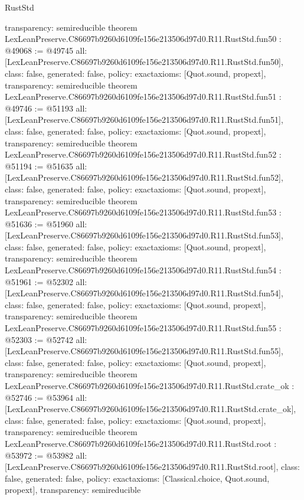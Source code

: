 \begin{lexlean}{RustStd}
\begin{coremodule}
{  transparency: semireducible
}
theorem LexLeanPreserve.C86697b9260d6109fe156e213506d97d0.R11.RustStd.fun50 : @49068 := @49745 {
  all: [LexLeanPreserve.C86697b9260d6109fe156e213506d97d0.R11.RustStd.fun50],
  class: false,
  generated: false,
  policy: exact{axioms: [Quot.sound, propext]},
  transparency: semireducible
}
theorem LexLeanPreserve.C86697b9260d6109fe156e213506d97d0.R11.RustStd.fun51 : @49746 := @51193 {
  all: [LexLeanPreserve.C86697b9260d6109fe156e213506d97d0.R11.RustStd.fun51],
  class: false,
  generated: false,
  policy: exact{axioms: [Quot.sound, propext]},
  transparency: semireducible
}
theorem LexLeanPreserve.C86697b9260d6109fe156e213506d97d0.R11.RustStd.fun52 : @51194 := @51635 {
  all: [LexLeanPreserve.C86697b9260d6109fe156e213506d97d0.R11.RustStd.fun52],
  class: false,
  generated: false,
  policy: exact{axioms: [Quot.sound, propext]},
  transparency: semireducible
}
theorem LexLeanPreserve.C86697b9260d6109fe156e213506d97d0.R11.RustStd.fun53 : @51636 := @51960 {
  all: [LexLeanPreserve.C86697b9260d6109fe156e213506d97d0.R11.RustStd.fun53],
  class: false,
  generated: false,
  policy: exact{axioms: [Quot.sound, propext]},
  transparency: semireducible
}
theorem LexLeanPreserve.C86697b9260d6109fe156e213506d97d0.R11.RustStd.fun54 : @51961 := @52302 {
  all: [LexLeanPreserve.C86697b9260d6109fe156e213506d97d0.R11.RustStd.fun54],
  class: false,
  generated: false,
  policy: exact{axioms: [Quot.sound, propext]},
  transparency: semireducible
}
theorem LexLeanPreserve.C86697b9260d6109fe156e213506d97d0.R11.RustStd.fun55 : @52303 := @52742 {
  all: [LexLeanPreserve.C86697b9260d6109fe156e213506d97d0.R11.RustStd.fun55],
  class: false,
  generated: false,
  policy: exact{axioms: [Quot.sound, propext]},
  transparency: semireducible
}
theorem LexLeanPreserve.C86697b9260d6109fe156e213506d97d0.R11.RustStd.crate_ok : @52746 := @53964 {
  all: [LexLeanPreserve.C86697b9260d6109fe156e213506d97d0.R11.RustStd.crate_ok],
  class: false,
  generated: false,
  policy: exact{axioms: [Quot.sound, propext]},
  transparency: semireducible
}
theorem LexLeanPreserve.C86697b9260d6109fe156e213506d97d0.R11.RustStd.root : @53972 := @53982 {
  all: [LexLeanPreserve.C86697b9260d6109fe156e213506d97d0.R11.RustStd.root],
  class: false,
  generated: false,
  policy: exact{axioms: [Classical.choice, Quot.sound, propext]},
  transparency: semireducible
}


\end{coremodule}
\end{lexlean}
